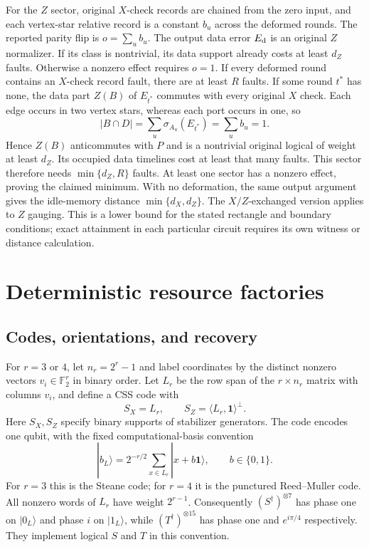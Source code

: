For the $Z$ sector, original $X$-check records are chained from the zero
input, and each vertex-star relative record is a constant $b_u$ across
the deformed rounds. The reported parity flip is $o=\sum_u b_u$.
The output data error $E_{\rm d}$ is an original $Z$ normalizer. If its
class is nontrivial, its data support already costs at least $d_Z$
faults. Otherwise a nonzero effect requires $o=1$. If every deformed
round contains an $X$-check record fault, there are at least $R$ faults.
If some round $t^*$ has none, the data part $Z(B)$ of $E_{t^*}$ commutes
with every original $X$ check. Each edge occurs in two vertex stars,
whereas each port occurs in one, so
\begin{equation}
 |B\cap D|=\sum_u\sigma_{A_u}(E_{t^*})=\sum_u b_u=1.
\end{equation}
Hence $Z(B)$ anticommutes with $P$ and is a nontrivial original logical
of weight at least $d_Z$. Its occupied data timelines cost at least that
many faults. This sector therefore needs $\min\{d_Z,R\}$ faults.
At least one sector has a nonzero effect, proving the claimed minimum.
With no deformation, the same output argument gives the idle-memory
distance $\min\{d_X,d_Z\}$. The $X/Z$-exchanged version applies to
$Z$ gauging. This is a lower bound for the stated rectangle and boundary
conditions; exact attainment in each particular circuit requires its own
witness or distance calculation.

\section{Deterministic resource factories}
\label{app:factories}

\subsection{Codes, orientations, and recovery}
For $r=3$ or $4$, let $n_r=2^r-1$ and label coordinates by the distinct
nonzero vectors $v_i\in\mathbb F_2^r$ in binary order. Let $L_r$ be the
row span of the $r\times n_r$ matrix with columns $v_i$, and define a
CSS code with
\begin{equation}
 S_X=L_r,\qquad S_Z=\langle L_r,\mathbf1\rangle^\perp.
\end{equation}
Here $S_X,S_Z$ specify binary supports of stabilizer generators. The
code encodes one qubit, with the fixed computational-basis convention
\begin{equation}
 |b_L\rangle=2^{-r/2}\sum_{x\in L_r}|x+b\mathbf1\rangle,
 \qquad b\in\{0,1\}.
 \label{eq:resource-codewords}
\end{equation}
For $r=3$ this is the Steane code; for $r=4$ it is the punctured
Reed--Muller code. All nonzero words of $L_r$ have weight $2^{r-1}$.
Consequently $(S^\dagger)^{\otimes7}$ has phase one on $|0_L\rangle$
and phase $i$ on $|1_L\rangle$, while
$(T^\dagger)^{\otimes15}$ has phase one and $e^{i\pi/4}$ respectively.
They implement logical $S$ and $T$ in this convention.

